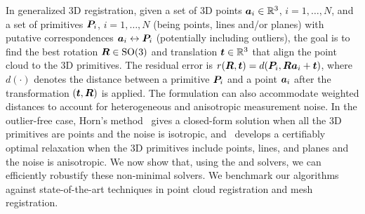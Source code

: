  In generalized 3D registration, given a set of 3D points 
${\bm a}_i \in { {\mathbb R}^{3} }$, $i=1,\ldots,N$, 
and a set of primitives ${\bm P}_i$, $i=1,\ldots,N$ 
(being points, lines and/or planes) with putative correspondences 
${\bm a}_i \leftrightarrow {\bm P}_i$ (potentially including outliers), 
the goal is to find the best 
rotation ${\bm R} \in \mathrm{SO}(3)$ and translation ${\bm t} \in { {\mathbb R}^{3} }$
that align the point cloud to the 3D primitives. The residual error is 
$r({\bm R},{\bm t}) = d({\bm P}_i,{\bm R} {\bm a}_i + {\bm t})$, 
where $d(\cdot)$ denotes the distance between a primitive ${\bm P}_i$ and a 
point ${\bm a}_i$ after the transformation $({\bm t},{\bm R})$ is applied. 
The formulation can also accommodate weighted distances to account for heterogeneous and anisotropic measurement noise. 
In the outlier-free case, Horn's method~\cite{Horn87josa} gives a closed-form solution when all the 3D primitives are points and the noise is isotropic, and~\cite{Briales17cvpr-registration} develops a certifiably optimal relaxation when the 3D primitives include points, lines, and planes and the noise is anisotropic. 
We now show that, using the \GNCGM and \GNCTLS solvers,
we can efficiently robustify these non-minimal solvers. 
We benchmark our algorithms against state-of-the-art techniques in point cloud registration and mesh registration.



